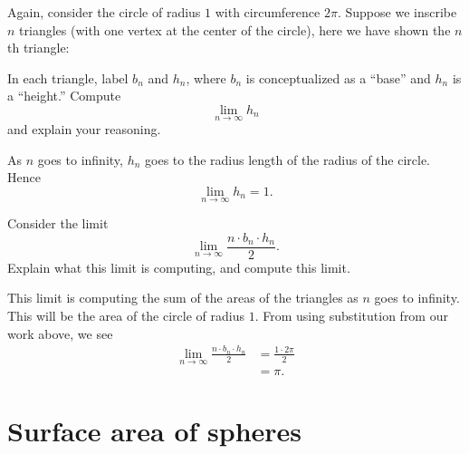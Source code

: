 \documentclass[newpage,hints,handout]{ximera}
\begin{document}
\begin{problem}
Again, consider the circle of radius $1$ with circumference $2\pi$.
Suppose we inscribe $n$ triangles (with one vertex at the center of
the circle), here we have shown the $n$th triangle:
\begin{image}
\end{image}
In each triangle, label $b_n$ and $h_n$, where $b_n$ is conceptualized
as a ``base'' and $h_n$ is a ``height.'' Compute
\[
\lim_{n\to \infty} h_n
\]
and explain your reasoning.
\begin{freeResponse}
As $n$ goes to infinity, $h_n$ goes to the radius length of the radius
of the circle. Hence
\[
\lim_{n\to \infty} h_n = 1.
\]
\end{freeResponse}
\end{problem}


\begin{problem}
Consider the limit
\[
\lim_{n\to\infty} \frac{n\cdot b_n\cdot h_n}{2}.
\]
Explain what this limit is computing, and compute this limit.
\begin{freeResponse}
This limit is computing the sum of the areas of the triangles as $n$
goes to infinity. This will be the area of the circle of radius
$1$. From using substitution from our work above, we see
\begin{align*}
\lim_{n\to\infty} \frac{n\cdot b_n\cdot h_n}{2} &= \frac{1\cdot 2\pi}{2}\\
&=\pi.
\end{align*}
\end{freeResponse}
\end{problem}


\section{Surface area of spheres}
\end{document}
